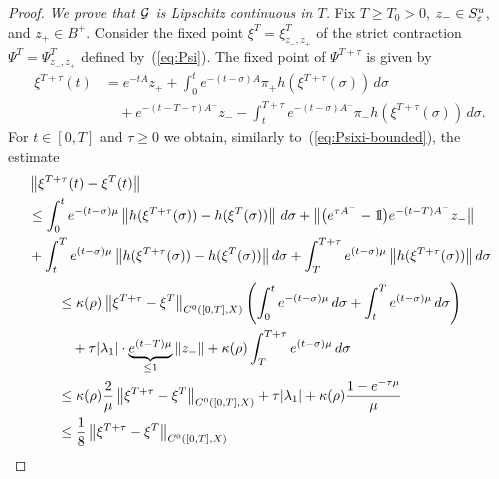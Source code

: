 \documentclass{article}
\begin{document}
\begin{proof}
{\it We prove that ${\mathcal{G}}$ is Lipschitz continuous in $T$.}
Fix $T\ge T_0>0$, ${z_-}\in S^u_{\varepsilon}$, and $z_+\in{B^+}$. Consider the fixed point
$\xi^T=\xi^T_{{z_-},z_+}$ of the strict contraction $\Psi^T=\Psi^T_{z_-,z_+}$ defined
by~(\ref{eq:Psi}). The fixed point of $\Psi^{T+\tau}$ is given by
\begin{equation}\label{eq:def-xi}
\begin{split}
     \xi^{T+\tau}(t)
    &=e^{-tA}z_+
     +\int_0^t e^{-(t-\sigma)A}\pi_+ h(\xi^{T+\tau}(\sigma)) \, d\sigma
     \\
    &\quad
     +e^{-(t-T-\tau)A^-}{z_-}
     -\int_t^{T+\tau} e^{-(t-\sigma)A^-}\pi_- h(\xi^{T+\tau}(\sigma)) \, d\sigma.
\end{split}
\end{equation}
For $t\in[0,T]$ and $\tau\ge0$ we obtain, similarly to~(\ref{eq:Psixi-bounded}), the estimate
\begin{equation*}
\begin{split}
    &\Norm{\xi^{T+\tau}(t)-\xi^T(t)}
   \\
    &\le\int_0^t e^{-(t-\sigma)\mu}
     \Norm{h(\xi^{T+\tau}(\sigma))-h(\xi^T(\sigma))} \, d\sigma
     +\bigl\| \bigl(e^{\tau A^-}-\1\bigr) e^{-(t-T)A^-}{z_-}\bigr\|
   \\
    &
     +\int_t^T e^{(t-\sigma)\mu}
     \Norm{h(\xi^{T+\tau}(\sigma))-h(\xi^T(\sigma))} d\sigma
     +\int_T^{T+\tau} e^{(t-\sigma)\mu} \Norm{h(\xi^{T+\tau}(\sigma))} d\sigma
\end{split}
\end{equation*}
\begin{equation*}
\begin{split}
    &\le \kappa(\rho)
     \Norm{\xi^{T+\tau}-\xi^T}_{C^0([0,T],X)}
     \left(\int_0^t e^{-(t-\sigma)\mu} \, d\sigma+\int_t^T e^{(t-\sigma)\mu}\, d\sigma\right)
   \\
    &\quad
     +\tau\abs{\lambda_1}\cdot \underbrace{e^{(t-T)\mu}}_{\le 1} \Norm{{z_-}}
     +\kappa(\rho)\int_T^{T+\tau} e^{(t-\sigma)\mu}\, d\sigma
   \\
    &\le \kappa(\rho)\frac{2}{\mu}\Norm{\xi^{T+\tau}-\xi^T}_{C^0([0,T],X)}
     +\tau\abs{\lambda_1}
     + \kappa(\rho) \frac{1-e^{-\tau\mu}}{\mu}
   \\
    &\le\frac{1}{8}
     \Norm{\xi^{T+\tau}-\xi^T}_{C^0([0,T],X)}

\end{split}
\end{equation*}
\end{proof}
\end{document}

